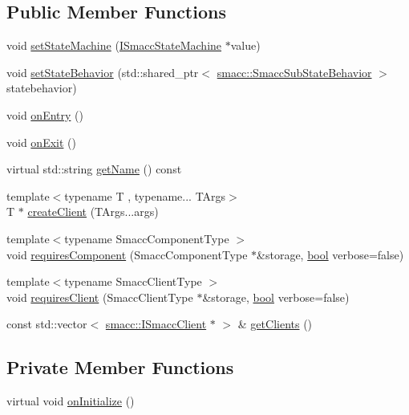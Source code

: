 \subsection*{Public Member Functions}
\begin{DoxyCompactItemize}
\item 
void \hyperlink{classsmacc_1_1Orthogonal_a05f65c01344a6c8593f7f88c0ca19654}{set\+State\+Machine} (\hyperlink{classsmacc_1_1ISmaccStateMachine}{I\+Smacc\+State\+Machine} $\ast$value)
\item 
void \hyperlink{classsmacc_1_1Orthogonal_a0476ba0e6575824893947918567ebbaa}{set\+State\+Behavior} (std\+::shared\+\_\+ptr$<$ \hyperlink{classsmacc_1_1SmaccSubStateBehavior}{smacc\+::\+Smacc\+Sub\+State\+Behavior} $>$ statebehavior)
\item 
void \hyperlink{classsmacc_1_1Orthogonal_a77888104f276bdbd177d69cf23f11a56}{on\+Entry} ()
\item 
void \hyperlink{classsmacc_1_1Orthogonal_a71c0df3d9e8327e65286e1ce0a3a7043}{on\+Exit} ()
\item 
virtual std\+::string \hyperlink{classsmacc_1_1Orthogonal_ae1ad57a2fda4d7f2ecf708c342fc1bb9}{get\+Name} () const 
\item 
{\footnotesize template$<$typename T , typename... T\+Args$>$ }\\T $\ast$ \hyperlink{classsmacc_1_1Orthogonal_a67ed4baa8cc385e42ba4a588e8686268}{create\+Client} (T\+Args...\+args)
\item 
{\footnotesize template$<$typename Smacc\+Component\+Type $>$ }\\void \hyperlink{classsmacc_1_1Orthogonal_a098b5be0f89d0911afc44c10b756ef2a}{requires\+Component} (Smacc\+Component\+Type $\ast$\&storage, \hyperlink{classbool}{bool} verbose=false)
\item 
{\footnotesize template$<$typename Smacc\+Client\+Type $>$ }\\void \hyperlink{classsmacc_1_1Orthogonal_af6f6d9cc5bf5433f5fe3b640a6a0b8aa}{requires\+Client} (Smacc\+Client\+Type $\ast$\&storage, \hyperlink{classbool}{bool} verbose=false)
\item 
const std\+::vector$<$ \hyperlink{classsmacc_1_1ISmaccClient}{smacc\+::\+I\+Smacc\+Client} $\ast$ $>$ \& \hyperlink{classsmacc_1_1Orthogonal_afc4e584a7bdb47f9c4e217a8eaf2505d}{get\+Clients} ()
\end{DoxyCompactItemize}
\subsection*{Private Member Functions}
\begin{DoxyCompactItemize}
\item 
virtual void \hyperlink{classsmacc_1_1Orthogonal_a7a3da420b1554e20aea3ed01067df05c}{on\+Initialize} ()
\end{DoxyCompactItemize}
